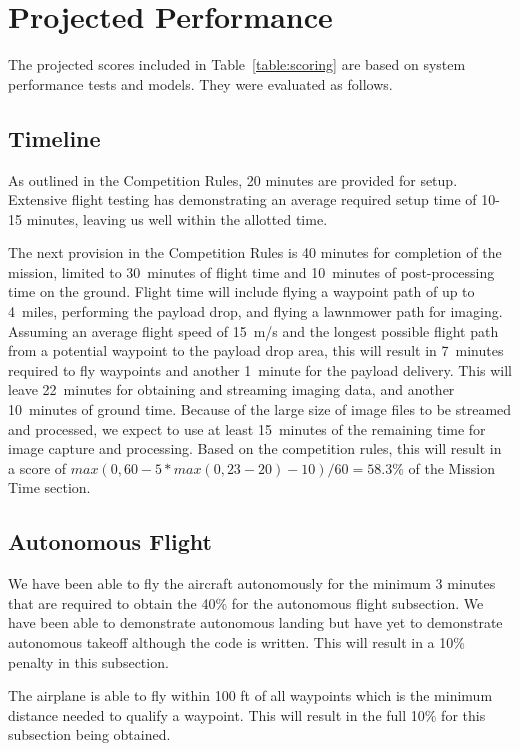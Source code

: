 \documentclass[]{auvsi_doc}
\begin{document}
\section{Projected Performance}
The projected scores included in Table~\ref{table:scoring} are based on system performance tests and models. They were evaluated as follows.

\subsection{Timeline}
As outlined in the Competition Rules, 20 minutes are provided for setup. Extensive flight testing has demonstrating an average required setup time of 10-15 minutes, leaving us well within the allotted time.

The next provision in the Competition Rules is 40 minutes for completion of the mission, limited to 30~minutes of flight time and 10~minutes of post-processing time on the ground. Flight time will include flying a waypoint path of up to 4~miles, performing the payload drop, and flying a lawnmower path for imaging. Assuming an average flight speed of 15~m/s and the longest possible flight path from a potential waypoint to the payload drop area, this will result in 7~minutes required to fly waypoints and another 1~minute for the payload delivery. This will leave 22~minutes for obtaining and streaming imaging data, and another 10~minutes of ground time. Because of the large size of image files to be streamed and processed, we expect to use at least 15~minutes of the remaining time for image capture and processing. Based on the competition rules, this will result in a score of $max\left(0, 60 − 5 * max(0, 23 − 20) − 10 \right) / 60 = 58.3\%$ of the Mission Time section.

\subsection{Autonomous Flight}
We have been able to fly the aircraft autonomously for the minimum 3 minutes that are required to obtain the 40\% for the autonomous flight subsection. We have been able to demonstrate autonomous landing but have yet to demonstrate autonomous takeoff although the code is written. This will result in a 10\% penalty in this subsection.

The airplane is able to fly within 100 ft of all waypoints which is the minimum distance needed to qualify a waypoint. This will result in the full 10\% for this subsection being obtained.
\end{document}
